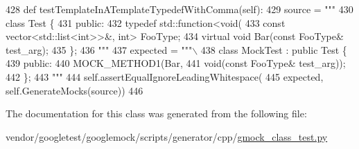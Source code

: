 \begin{DoxyCode}
428   \textcolor{keyword}{def }testTemplateInATemplateTypedefWithComma(self):
429     source = \textcolor{stringliteral}{"""}
430 \textcolor{stringliteral}{class Test \{}
431 \textcolor{stringliteral}{ public:}
432 \textcolor{stringliteral}{  typedef std::function<void(}
433 \textcolor{stringliteral}{      const vector<std::list<int>>&, int> FooType;}
434 \textcolor{stringliteral}{  virtual void Bar(const FooType& test\_arg);}
435 \textcolor{stringliteral}{\};}
436 \textcolor{stringliteral}{"""}
437     expected = \textcolor{stringliteral}{"""\(\backslash\)}
438 \textcolor{stringliteral}{class MockTest : public Test \{}
439 \textcolor{stringliteral}{public:}
440 \textcolor{stringliteral}{MOCK\_METHOD1(Bar,}
441 \textcolor{stringliteral}{void(const FooType& test\_arg));}
442 \textcolor{stringliteral}{\};}
443 \textcolor{stringliteral}{"""}
444     self.assertEqualIgnoreLeadingWhitespace(
445         expected, self.GenerateMocks(source))
446 
\end{DoxyCode}


The documentation for this class was generated from the following file\+:\begin{DoxyCompactItemize}
\item 
vendor/googletest/googlemock/scripts/generator/cpp/\hyperlink{gmock__class__test_8py}{gmock\+\_\+class\+\_\+test.\+py}\end{DoxyCompactItemize}
